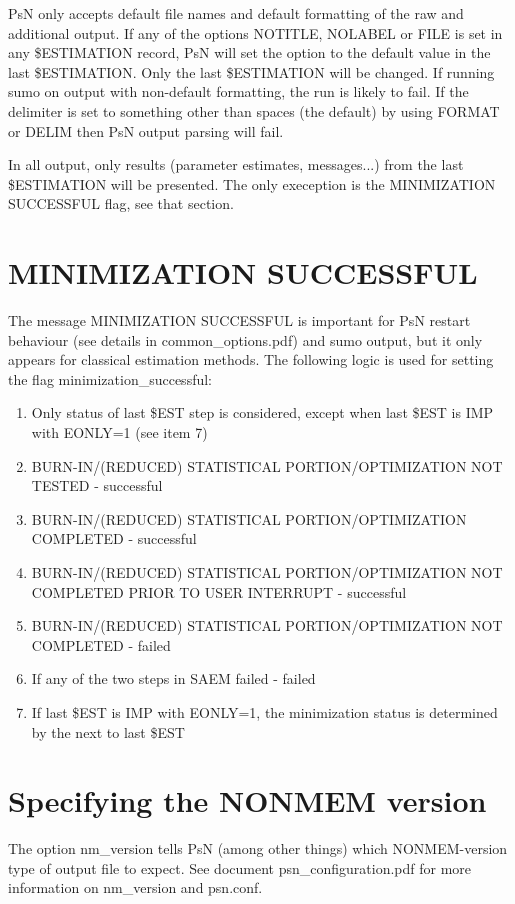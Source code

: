 PsN only accepts default file names and default formatting of the raw and additional output. If any of the options NOTITLE, NOLABEL or FILE is set in any \$ESTIMATION record, PsN will set the option to the default value in the last \$ESTIMATION. Only the last \$ESTIMATION will be changed. If running sumo on output with non-default formatting, the run is likely to fail. If the delimiter is set to something other than spaces (the default) by using FORMAT or DELIM then PsN output parsing will fail.

In all output, only results (parameter estimates, messages...) from the last \$ESTIMATION will be presented. The only exeception is the MINIMIZATION SUCCESSFUL flag, see that section.

\section{MINIMIZATION SUCCESSFUL}

The message MINIMIZATION SUCCESSFUL is important for PsN restart behaviour (see details in common\_options.pdf) and sumo output, but it only appears for classical estimation methods. The following logic is used for setting the flag minimization\_successful:

\begin{enumerate}
\item Only status of last \$EST step is considered, except when last \$EST is IMP with EONLY=1 (see item 7)
\item BURN-IN/(REDUCED) STATISTICAL PORTION/OPTIMIZATION NOT TESTED - successful
\item BURN-IN/(REDUCED) STATISTICAL PORTION/OPTIMIZATION COMPLETED - successful
\item BURN-IN/(REDUCED) STATISTICAL PORTION/OPTIMIZATION NOT COMPLETED PRIOR TO USER INTERRUPT - successful
\item BURN-IN/(REDUCED) STATISTICAL PORTION/OPTIMIZATION NOT COMPLETED - failed
\item If any of the two steps in SAEM failed - failed 
\item If last \$EST is IMP with EONLY=1, the minimization status is determined by the next to last \$EST
\end{enumerate}

\section{Specifying the NONMEM version}

The option nm\_version tells PsN (among other things) which NONMEM-version type of output file to expect. See document psn\_configuration.pdf for more information on nm\_version and psn.conf.

